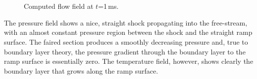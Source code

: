 \begin{figure}[htbp]
 \centering
 \\
 \\
 \caption{Computed flow field at $t$=1\,ms.}
 \label{fig:convex-ramp-field-data}
\end{figure}

\medskip
The pressure field shows a nice, straight shock propagating into the free-stream, 
with an almost constant pressure region between the shock and the straight ramp surface.
The faired section produces a smoothly decreasing pressure and, true to boundary layer theory, 
the pressure gradient through the boundary layer to the ramp surface is essentially zero.
The temperature field, however, shows clearly the boundary layer that grows along the ramp surface.

